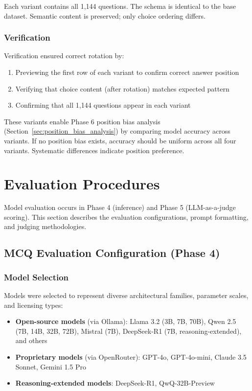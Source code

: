 Each variant contains all 1,144 questions. The schema is identical to the base dataset. Semantic content is preserved; only choice ordering differs.

\subsubsection{Verification}

Verification ensured correct rotation by:
\begin{enumerate}
    \item Previewing the first row of each variant to confirm correct answer position
    \item Verifying that choice content (after rotation) matches expected pattern
    \item Confirming that all 1,144 questions appear in each variant
\end{enumerate}

These variants enable Phase 6 position bias analysis (Section~\ref{sec:position_bias_analysis}) by comparing model accuracy across variants. If no position bias exists, accuracy should be uniform across all four variants. Systematic differences indicate position preference.

\section{Evaluation Procedures}\label{sec:evaluation_methods_computations}

Model evaluation occurs in Phase 4 (inference) and Phase 5 (LLM-as-a-judge scoring). This section describes the evaluation configurations, prompt formatting, and judging methodologies.

\subsection{MCQ Evaluation Configuration (Phase 4)}\label{sec:mcq_eval}

\subsubsection{Model Selection}

Models were selected to represent diverse architectural families, parameter scales, and licensing types:

\begin{itemize}
    \item \textbf{Open-source models} (via Ollama): Llama 3.2 (3B, 7B, 70B), Qwen 2.5 (7B, 14B, 32B, 72B), Mistral (7B), DeepSeek-R1 (7B, reasoning-extended), and others
    \item \textbf{Proprietary models} (via OpenRouter): GPT-4o, GPT-4o-mini, Claude 3.5 Sonnet, Gemini 1.5 Pro
    \item \textbf{Reasoning-extended models}: DeepSeek-R1, QwQ-32B-Preview
\end{itemize}

